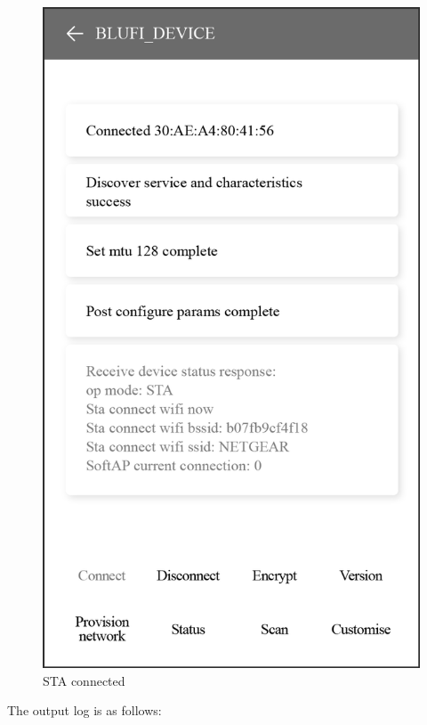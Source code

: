 \documentclass[a4paper,12pt,openany]{book}
\begin{document}
\begin{figure}[!h]
\begin{minipage}[b]{0.4\textwidth}
    \includegraphics[width=\textwidth]{D7Z/7-43}
    \caption{STA connected}
  \end{minipage}
\end{figure}

The output log is as follows:
\end{document}
